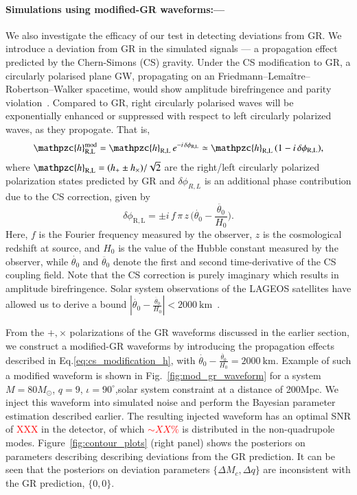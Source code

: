 \documentclass[prl,preprintnumbers,twocolumn,eqsecnum,floatfix,a4paper,nofootinbib,superscriptaddress]{revtex4}
\newcommand{\red}[1]{\textcolor{red}{#1}}
\newcommand{\h}{\mathpzc{h}}
\begin{document}
\paragraph{Simulations using modified-GR waveforms:---}

We also investigate the efficacy of our test in detecting deviations from GR. We introduce a deviation from GR in the simulated signals --- a propagation effect predicted by the Chern-Simons (CS) gravity. Under the CS modification to GR, a circularly polarised plane GW, propagating on an Friedmann–Lema\^itre–Robertson–Walker spacetime, would show amplitude birefringence and parity violation~\cite{Yunes:2010yf}. Compared to GR, right circularly polarised waves will be exponentially enhanced or suppressed with respect to left circularly polarized waves, as they propogate. That is, 
% 
\begin{equation}
\h_\mathrm{R,L}^\mathrm{mod} = \h_\mathrm{R,L} \, e^{-i \, \delta\phi_\mathrm{R,L}} \simeq  \h_\mathrm{R,L} \, (1 -i \, \delta\phi_\mathrm{R,L}),
\label{eq:cs_modification_h}
\end{equation}
where $\h_\mathrm{R,L} = (h_+ \pm h_\times)/\sqrt{2}$ are the right/left circularly polarized polarization states predicted by GR and $\delta \phi_{R,L}$ is an additional phase contribution due to the CS correction, given by 
\begin{equation}
\delta \phi_\mathrm{R,L}= \pm i \, f \, \pi \, z \, \Big(\dot{\theta_0}-\frac{\ddot{\theta_0}}{H_0}\Big).
\label{eq:cs_modification_dphi}
\end{equation}
Here, $f$ is the Fourier frequency measured by the observer, $z$ is the cosmological redshift at source, and ${H_0}$ is the value of the Hubble constant measured by the observer, while $\dot{\theta_0}$ and $\ddot{\theta_0}$ denote the first and second time-derivative of the CS coupling field. Note that the CS correction is purely imaginary which results in amplitude birefringence. Solar system observations of the LAGEOS satellites have allowed us to derive a bound $|\dot{\theta_0}-\frac{\ddot{\theta_0}}{H_0}| < 2000~\mathrm{km}$~\cite{Yunes:2010yf,Smith:2007jm}.

From the $+,\times$ polarizations of the GR waveforms discussed in the earlier section, we construct a modified-GR waveforms by introducing the propagation effects described in Eq.\eqref{eq:cs_modification_h}, with $\dot{\theta_0}-\frac{\ddot{\theta_0}}{H_0} = 2000~\mathrm{km}$. Example of such a modified waveform is shown in Fig.~\ref{fig:mod_gr_waveform} for a system $M = 80M_{\odot}$, $q =9$, $\iota = 90^{\circ}$,solar system constraint at a distance of 200Mpc. We inject this waveform into simulated noise and perform the Bayesian parameter estimation described earlier. The resulting injected waveform has an optimal SNR of \red{XXX} in the detector, of which \red{$\sim XX\%$} is distributed in the non-quadrupole modes. Figure~\ref{fig:contour_plots} (right panel) shows the posteriors on parameters describing describing deviations from the GR prediction. It can be seen that the posteriors on deviation parameters $\{\Delta M_c, \Delta q\}$ are inconsistent with the GR prediction, $\{0, 0\}$. 
\end{document}
